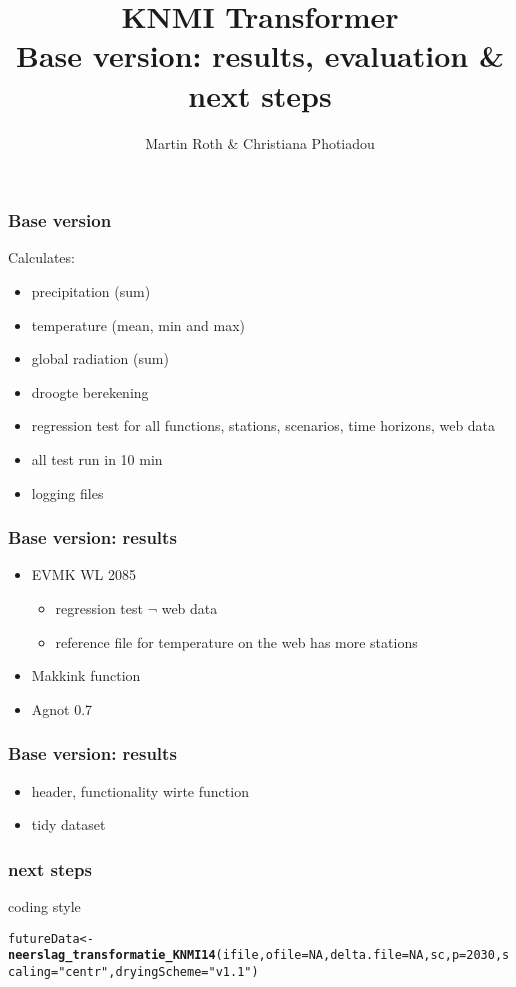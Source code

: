 \documentclass{beamer}\usepackage[]{graphicx}\usepackage[]{color}
\title[KNMI Transformer]{KNMI Transformer \\ Base version: results, evaluation \& next steps}
\author[]{\tiny{Martin Roth \& Christiana Photiadou}}
\makeatletter
\newcommand{\hlnum}[1]{\textcolor[rgb]{0.686,0.059,0.569}{#1}}%
\newcommand{\hlstr}[1]{\textcolor[rgb]{0.192,0.494,0.8}{#1}}%
\newcommand{\hlstd}[1]{\textcolor[rgb]{0.345,0.345,0.345}{#1}}%
\newcommand{\hlkwb}[1]{\textcolor[rgb]{0.69,0.353,0.396}{#1}}%
\newcommand{\hlkwc}[1]{\textcolor[rgb]{0.333,0.667,0.333}{#1}}%
\newcommand{\hlkwd}[1]{\textcolor[rgb]{0.737,0.353,0.396}{\textbf{#1}}}%
\newenvironment{kframe}{%
 \def\at@end@of@kframe{}%
 \ifinner\ifhmode%
  \def\at@end@of@kframe{\end{minipage}}%
  \begin{minipage}{\columnwidth}%
 \fi\fi%
 \def\FrameCommand##1{\hskip\@totalleftmargin \hskip-\fboxsep
 \colorbox{shadecolor}{##1}\hskip-\fboxsep
     \hskip-\linewidth \hskip-\@totalleftmargin \hskip\columnwidth}%
 \MakeFramed {\advance\hsize-\width
   \@totalleftmargin\z@ \linewidth\hsize
   \@setminipage}}%
 {\par\unskip\endMakeFramed%
 \at@end@of@kframe}
\newenvironment{knitrout}{}{} %
\makeatother
\begin{document}
\maketitle

\begin{frame}[fragile]
\frametitle{Base version}
Calculates:
  \begin{itemize}
    \item precipitation (sum)
    \item temperature (mean, min and max)
    \item global radiation (sum)
    \item droogte berekening
    \item regression test for all functions, stations, scenarios, time horizons, web data
    \item all test run in 10 min
    \item logging files
  \end{itemize}
\end{frame}


\begin{frame}
\frametitle{Base version: results}
  \begin{itemize}
    \item EVMK WL 2085
     \begin{itemize}
        \item regression test $\neg$ web data
        \item reference file for temperature on the web has more stations
    \end{itemize}
    \item Makkink function
    \item Agnot 0.7
  \end{itemize}
\end{frame}

\begin{frame}
\frametitle{Base version: results}
 \begin{itemize}
  \item header, functionality wirte function
  \item tidy dataset
\end{itemize}

\end{frame}

\begin{frame}[fragile]
\frametitle{next steps}
coding style
\begin{knitrout}
\color{fgcolor}\begin{kframe}
\begin{alltt}
\hlstd{futureData} \hlkwb{<-} \hlkwd{neerslag_transformatie_KNMI14}\hlstd{(ifile,}\hlkwc{ofile}\hlstd{=}\hlnum{NA}\hlstd{,}\hlkwc{delta.file}\hlstd{=}\hlnum{NA}\hlstd{,sc,}\hlkwc{p}\hlstd{=}\hlnum{2030}\hlstd{,}\hlkwc{scaling}\hlstd{=}\hlstr{"centr"}\hlstd{,}\hlkwc{dryingScheme}\hlstd{=}\hlstr{"v1.1"}\hlstd{)}
\end{alltt}
\end{kframe}
\end{knitrout}
\end{frame}
\end{document}
